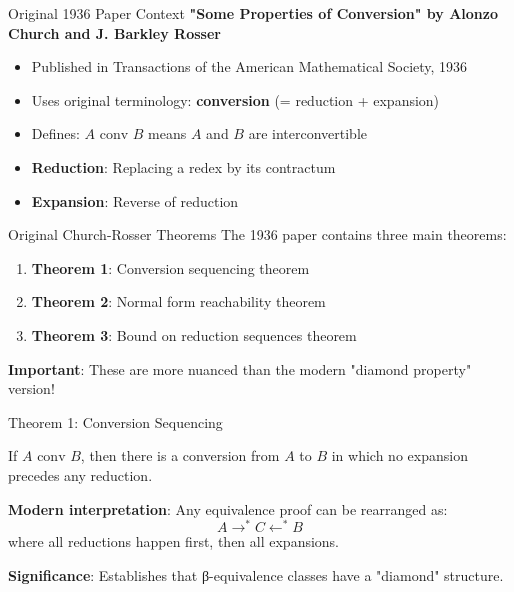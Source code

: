 \documentclass[10pt]{beamer}
\begin{document}
\begin{frame}{Original 1936 Paper Context}
\textbf{"Some Properties of Conversion" by Alonzo Church and J. Barkley Rosser}

\begin{itemize}
\item Published in Transactions of the American Mathematical Society, 1936
\item Uses original terminology: \textbf{conversion} (= reduction + expansion)
\item Defines: \(A \text{ conv } B\) means \(A\) and \(B\) are interconvertible
\item \textbf{Reduction}: Replacing a redex by its contractum
\item \textbf{Expansion}: Reverse of reduction
\end{itemize}
\end{frame}

\begin{frame}{Original Church-Rosser Theorems}
The 1936 paper contains three main theorems:

\begin{enumerate}
\item \textbf{Theorem 1}: Conversion sequencing theorem
\item \textbf{Theorem 2}: Normal form reachability theorem  
\item \textbf{Theorem 3}: Bound on reduction sequences theorem
\end{enumerate}

\vspace{0.3cm}
\textbf{Important}: These are more nuanced than the modern "diamond property" version!
\end{frame}

\begin{frame}{Theorem 1: Conversion Sequencing}
\begin{theorem}
If \(A \text{ conv } B\), then there is a conversion from \(A\) to \(B\) in which no expansion precedes any reduction.
\end{theorem}

\vspace{0.3cm}
\textbf{Modern interpretation}: Any equivalence proof can be rearranged as:
\[
A \rightarrow^* C \leftarrow^* B
\]
where all reductions happen first, then all expansions.

\vspace{0.3cm}
\textbf{Significance}: Establishes that β-equivalence classes have a "diamond" structure.
\end{frame}
\end{document}
